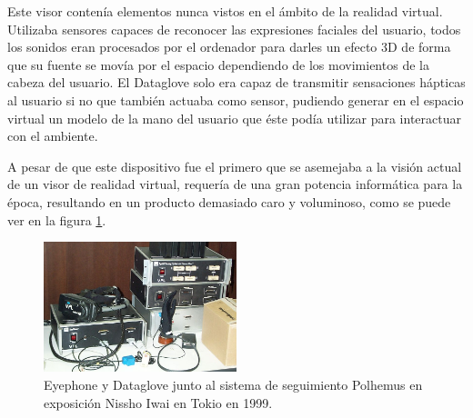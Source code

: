 Este visor contenía elementos nunca vistos en el ámbito de la realidad virtual. Utilizaba sensores capaces de reconocer las expresiones faciales del usuario, todos los sonidos eran procesados por el ordenador para darles un efecto 3D de forma que su fuente se movía por el espacio dependiendo de los movimientos de la cabeza del usuario. El Dataglove solo era capaz de transmitir sensaciones hápticas al usuario si no que también actuaba como sensor, pudiendo generar en el espacio virtual un modelo de la mano del usuario que éste podía utilizar para interactuar con el ambiente. \cite{EA_vr_dataglove}

A pesar de que este dispositivo fue el primero que se asemejaba a la visión actual de un visor de realidad virtual, requería de una gran potencia informática para la época, resultando en un producto demasiado caro y voluminoso, como se puede ver en la figura \ref{fig:EA_eyePhone}.





\begin{figure}[H]
  \centering
\includegraphics[width=0.5\textwidth]{03.EstudioProblema/01.EstadoArte/00.Figuras/17.eyephone_dataglove.jpg}
    \caption{Eyephone y Dataglove junto al sistema de seguimiento Polhemus en exposición Nissho Iwai en Tokio en 1999. \cite{EA_img_eyePhone}}
    \label{fig:EA_eyePhone}
\end{figure}


